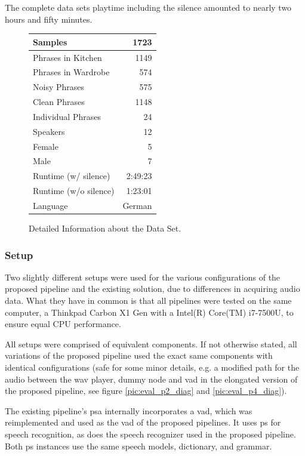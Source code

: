 The complete data sets playtime including the silence amounted to nearly two hours and fifty minutes.


\begin{figure}[]
	\centering
	\begin{tabular}{| l | r |}
		\hline
		Samples 				& 1723	 	\\ \hline
		Phrases	in Kitchen		& 1149		\\ \hline
		Phrases	in Wardrobe		& 574		\\ \hline
		Noisy Phrases			& 575		\\ \hline
		Clean Phrases			& 1148		\\ \hline
		Individual Phrases		& 24 		\\ \hline
		Speakers 				& 12	 	\\ \hline
		Female					& 5 		\\ \hline
		Male	 				& 7			\\ \hline
		Runtime (w/ silence) 	& 2:49:23	\\ \hline
		Runtime (w/o silence) 	& 1:23:01	\\ \hline
		Language 				& German	\\ \hline
	\end{tabular}
	\caption{Detailed Information about the Data Set.}
	\label{table:eval_dataset_info}
\end{figure}

\subsubsection{Setup}
\label{eval:dataset:setup}

Two slightly different setups were used for the various configurations of the proposed pipeline and the existing solution, due to differences in acquiring audio data.
What they have in common is that all pipelines were tested on the same computer, a Thinkpad Carbon X1 Gen with a Intel(R) Core(TM) i7-7500U, to ensure equal CPU performance.

All setups were comprised of equivalent components. 
If not otherwise stated, all variations of the proposed pipeline used the exact same components with identical configurations (safe for some minor details, e.g. a modified path for the audio between the wav player, dummy node and \gls{vad} in the elongated version of the proposed pipeline, see figure \ref{pic:eval_p2_diag} and \ref{pic:eval_p4_diag}).

The existing pipeline's \gls{psa} internally incorporates a \gls{vad}, which was reimplemented and used as the \gls{vad} of the proposed pipelines.
It uses \gls{ps} for speech recognition, as does the speech recognizer used in the proposed pipeline. 
Both \gls{ps} instances use the same speech models, dictionary, and grammar.

